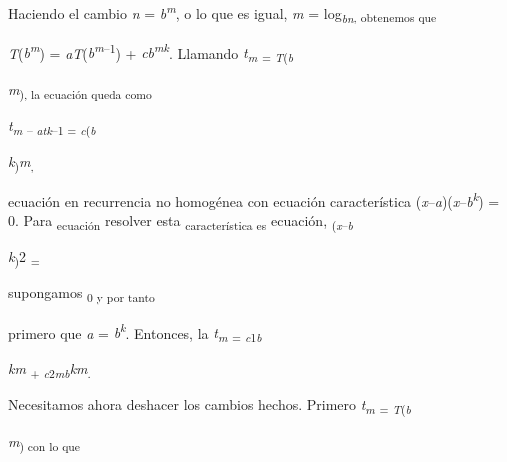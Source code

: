 \documentclass[12pt]{article}
\renewcommand{\_}{\kern-1.5pt\textunderscore\kern-1.5pt}
\begin{document}
{\fontsize{10pt}{12.0pt}\selectfont Haciendo el cambio \textit{n }= \textit{b\textsuperscript{m}}, o lo que es igual, \textit{m }= log\textit{\textsubscript{bn}}\textsubscript{, obtenemos que }\par}\par

{\fontsize{10pt}{12.0pt}\selectfont \textit{T}(\textit{b\textsuperscript{m}}) = \textit{aT}(\textit{b\textsuperscript{m}}\textsuperscript{–1}) + \textit{cb\textsuperscript{mk}}. Llamando \textit{t\textsubscript{m }}\textsubscript{= \textit{T}(\textit{b}}{\fontsize{7pt}{8.4pt}\selectfont \textit{m}\textsubscript{), la ecuación queda como }\par}\par}\par

{\fontsize{10pt}{12.0pt}\selectfont \textit{t\textsubscript{m }}\textsubscript{– \textit{atk}–1 = \textit{c}(\textit{b}}{\fontsize{7pt}{8.4pt}\selectfont \textit{k}\textsubscript{)}\textit{m}\textsubscript{, }{\fontsize{10pt}{12.0pt}\selectfont ecuación en recurrencia no homogénea con ecuación característica (\textit{x}–\textit{a})(\textit{x}–\textit{b\textsuperscript{k}}) = 0. Para \textsubscript{ecuación }resolver esta \textsubscript{característica es }ecuación, \textsubscript{(\textit{x}–\textit{b}}{\fontsize{7pt}{8.4pt}\selectfont \textit{k}\textsubscript{)}2 \textsubscript{= }{\fontsize{10pt}{12.0pt}\selectfont supongamos \textsubscript{0 y por tanto }\par}\par}\par}\par}\par}\par

{\fontsize{10pt}{12.0pt}\selectfont primero que \textit{a }= \textit{b\textsuperscript{k}}. Entonces, la \textit{t\textsubscript{m }}\textsubscript{= \textit{c}1\textit{b}}{\fontsize{7pt}{8.4pt}\selectfont \textit{km }\textsubscript{+ \textit{c}2\textit{mb}}\textit{km}\textsubscript{. }{\fontsize{10pt}{12.0pt}\selectfont Necesitamos ahora deshacer los cambios hechos. Primero \textit{t\textsubscript{m }}\textsubscript{= \textit{T}(\textit{b}}{\fontsize{7pt}{8.4pt}\selectfont \textit{m}\textsubscript{) con lo que }\par}\par}\par}\par}\par
\end{document}
